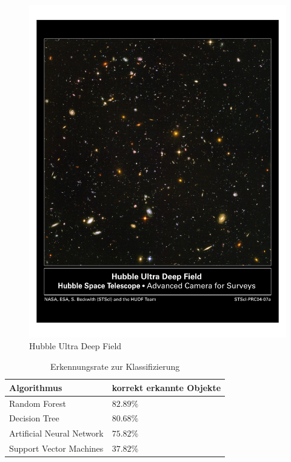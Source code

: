 \documentclass[12pt,journal,compsoc,ngerman]{IEEEtran}
\begin{document}
% 
% 
% 
% 

\begin{figure}[!t]
\centering
\includegraphics[scale=0.45,trim={40 400 40 80},clip]{../beamer/hs-2004-07-a-pdf}
\caption{Hubble Ultra Deep Field \cite{HUDF}}
\label{fig:hs-2004-07-a-pdf}
\end{figure}

\begin{table}[!b]
\centering
\caption{Erkennungsrate zur Klassifizierung \cite{o2009star}}
\begin{tabular}{l|l}
Algorithmus               & korrekt erkannte Objekte\\ \hline
Random Forest             & $82.89\%$ \\
Decision Tree             & $80.68\%$ \\
Artificial Neural Network & $75.82\%$ \\
Support Vector Machines   & $37.82\%$
\end{tabular}
\label{tab:Erkennungswahrscheinlichkeiten}
\end{table}
\end{document}
